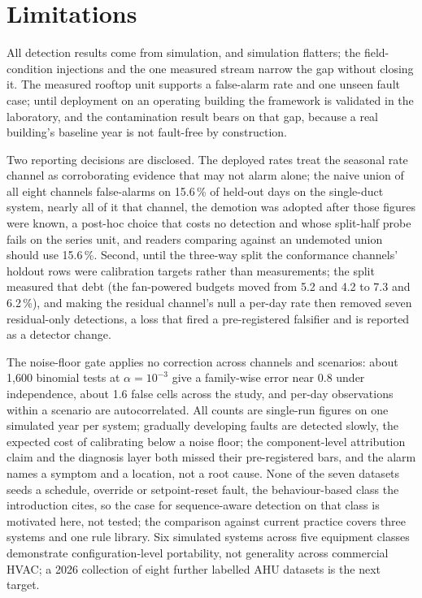 \documentclass[11pt,letterpaper]{article}
\begin{document}
\section{Limitations}
\label{sec:limitations}

All detection results come from simulation, and simulation flatters; the field-condition injections and the one measured stream narrow the gap without closing it. The measured rooftop unit supports a false-alarm rate and one unseen fault case; until deployment on an operating building the framework is validated in the laboratory, and the contamination result bears on that gap, because a real building's baseline year is not fault-free by construction.

Two reporting decisions are disclosed. The deployed rates treat the seasonal rate channel as corroborating evidence that may not alarm alone; the naive union of all eight channels false-alarms on 15.6\,\% of held-out days on the single-duct system, nearly all of it that channel, the demotion was adopted after those figures were known, a post-hoc choice that costs no detection and whose split-half probe fails on the series unit, and readers comparing against an undemoted union should use 15.6\,\%. Second, until the three-way split the conformance channels' holdout rows were calibration targets rather than measurements; the split measured that debt (the fan-powered budgets moved from 5.2 and 4.2 to 7.3 and 6.2\,\%), and making the residual channel's null a per-day rate then removed seven residual-only detections, a loss that fired a pre-registered falsifier and is reported as a detector change.

The noise-floor gate applies no correction across channels and scenarios: about 1{,}600 binomial tests at $\alpha = 10^{-3}$ give a family-wise error near 0.8 under independence, about 1.6 false cells across the study, and per-day observations within a scenario are autocorrelated. All counts are single-run figures on one simulated year per system; gradually developing faults are detected slowly, the expected cost of calibrating below a noise floor; the component-level attribution claim and the diagnosis layer both missed their pre-registered bars, and the alarm names a symptom and a location, not a root cause. None of the seven datasets seeds a schedule, override or setpoint-reset fault, the behaviour-based class the introduction cites, so the case for sequence-aware detection on that class is motivated here, not tested; the comparison against current practice covers three systems and one rule library. Six simulated systems across five equipment classes demonstrate configuration-level portability, not generality across commercial HVAC; a 2026 collection of eight further labelled AHU datasets \cite{ghalamsiah2026ahudatasets} is the next target.
\end{document}
